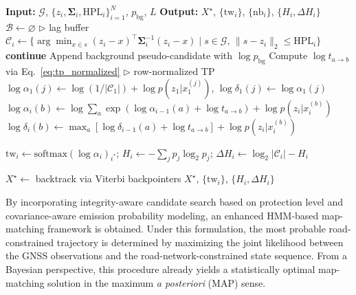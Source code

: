 \documentclass[letterpaper,journal]{IEEEtran}
\begin{document}
\begin{algorithm}[t]
\caption{CMM: Covariance-Aware Map Matching with Trustworthiness}
\label{alg:cmm_hmm}
\begin{algorithmic}[1]
\State \textbf{Input:} $\mathcal{G}$, $\{z_i,\boldsymbol{\Sigma}_i,\text{HPL}_i\}_{i=1}^{N}$, $p_{\text{bg}}$, $L$
\State \textbf{Output:} $X^\star$, $\{\text{tw}_i\}$, $\{\text{nb}_i\}$, $\{H_i,\Delta H_i\}$
\State $\mathcal{B} \leftarrow \varnothing$ \hfill $\triangleright$ lag buffer
    \State $\mathcal{C}_i \leftarrow \big\{ \arg\min_{x \in s} (z_i-x)^{\!\top}\!\boldsymbol{\Sigma}_i^{-1}(z_i-x) \;\big|\; s\!\in\!\mathcal{G},\,\|s-z_i\|_2\!\le\!\text{HPL}_i \big\}$
     \State \textbf{continue} \EndIf
    \State Append background pseudo-candidate with $\log p_{\text{bg}}$
    \State Compute $\log t_{a\to b}$ via Eq.~\eqref{eq:tp_normalized} \hfill $\triangleright$ row-normalized TP
        \State $\log\alpha_1(j) \leftarrow \log(1/|\mathcal{C}_1|) + \log p(z_1|x_1^{(j)})$, \quad $\log\delta_1(j) \leftarrow \log\alpha_1(j)$
    \Else
        \State $\log\alpha_i(b) \leftarrow \log\!\sum_a\!\exp(\log\alpha_{i-1}(a)+\log t_{a\to b}) + \log p(z_i|x_i^{(b)})$
        \State $\log\delta_i(b) \leftarrow \max_a[\log\delta_{i-1}(a)+\log t_{a\to b}] + \log p(z_i|x_i^{(b)})$
    \EndIf

        \State $\text{tw}_i \leftarrow \text{softmax}(\log\alpha_i)_{i^*}$; 
        \State $H_i \leftarrow -\sum_j p_j\log_2 p_j$; \hspace{4pt} $\Delta H_i \leftarrow \log_2|\mathcal{C}_i| - H_i$
        
\EndFor

\State $X^\star \leftarrow$ backtrack via Viterbi backpointers
\State \Return $X^\star$, $\{\text{tw}_i\}$, $\{H_i,\Delta H_i\}$
\end{algorithmic}
\end{algorithm}


By incorporating integrity-aware candidate search based on protection level
and covariance-aware emission probability modeling, an enhanced HMM-based
map-matching framework is obtained. Under this formulation, the most probable
road-constrained trajectory is determined by maximizing the joint likelihood
between the GNSS observations and the road-network-constrained state sequence.
From a Bayesian perspective, this procedure already yields a statistically
optimal map-matching solution in the maximum \emph{a posteriori} (MAP) sense.
\end{document}
